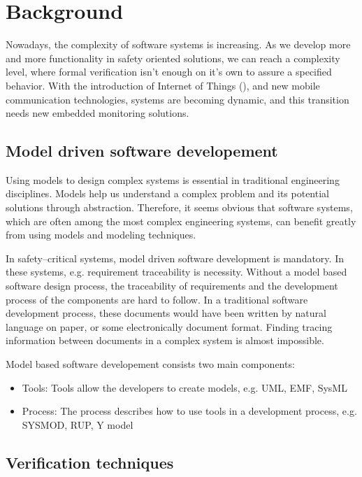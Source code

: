 \chapter{Background}
\label{chap:background}

Nowadays, the complexity of software systems is increasing. As we develop more and more functionality in safety oriented solutions, we can reach a complexity level, where formal verification isn't enough on it's own to assure a specified behavior. With the introduction of Internet of Things (\iot), and new mobile communication technologies, systems are becoming dynamic, and this transition needs new embedded monitoring solutions.

\section{Model driven software developement}

Using models to design complex systems is essential in traditional engineering disciplines. Models help us understand a complex problem and its potential solutions through abstraction. Therefore, it seems obvious that software systems, which are often among the most complex engineering systems, can benefit greatly from using models and modeling techniques. \citep{pastor2008model}

In safety--critical systems, model driven software development is mandatory. In these systems, e.g. requirement traceability is necessity. Without a model based software design process, the traceability of requirements and the development process of the components are hard to follow. In a traditional software development process, these documents would have been written by natural language on paper, or some electronically document format. Finding tracing information between documents in a complex system is almost impossible.

Model based software developement consists two main components:
\begin{itemize}
	\item Tools: Tools allow the developers to create models, e.g. UML, EMF, SysML
	\item Process: The process describes how to use tools in a development process, e.g. SYSMOD, RUP, Y model
\end{itemize}

\section{Verification techniques}


